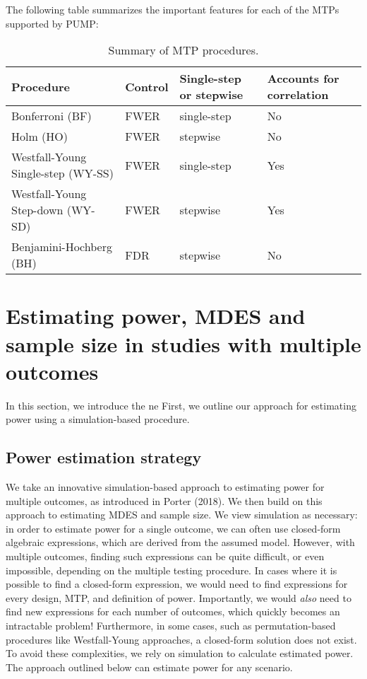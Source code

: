 \documentclass[
]{article}
\begin{document}
The following table summarizes the important features for each of the
MTPs supported by PUMP:

\begin{table}[h!]
\centering
\begin{tabular}{l l l l}
Procedure                             & Control & Single-step or stepwise & Accounts for correlation \\ \hline
Bonferroni (BF)                       & FWER    & single-step             & No                       \\
Holm (HO)                             & FWER    & stepwise                & No\\
Westfall-Young Single-step (WY-SS)    & FWER    & single-step             & Yes\\
Westfall-Young Step-down (WY-SD)      & FWER    & stepwise                & Yes\\
Benjamini-Hochberg (BH)               & FDR     & stepwise                & No
\end{tabular}
\caption{Summary of MTP procedures.}
  \label{tab:mtp}
\end{table}

\section{Estimating power, MDES and sample size in studies with multiple outcomes}
\label{sec:est}

In this section, we introduce the ne First, we outline our approach for
estimating power using a simulation-based procedure.

\subsection{Power estimation strategy}
\label{sec:est_power}

We take an innovative simulation-based approach to estimating power for
multiple outcomes, as introduced in Porter (2018). We then build on this
approach to estimating MDES and sample size. We view simulation as
necessary: in order to estimate power for a single outcome, we can often
use closed-form algebraic expressions, which are derived from the
assumed model. However, with multiple outcomes, finding such expressions
can be quite difficult, or even impossible, depending on the multiple
testing procedure. In cases where it is possible to find a closed-form
expression, we would need to find expressions for every design, MTP, and
definition of power. Importantly, we would \emph{also} need to find new
expressions for each number of outcomes, which quickly becomes an
intractable problem! Furthermore, in some cases, such as
permutation-based procedures like Westfall-Young approaches, a
closed-form solution does not exist. To avoid these complexities, we
rely on simulation to calculate estimated power. The approach outlined
below can estimate power for any scenario.
\end{document}
